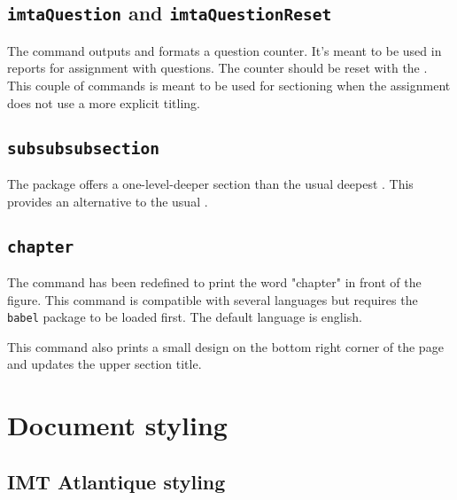 \documentclass{report}
\begin{document}
\subsection{\texttt{imtaQuestion} and \texttt{imtaQuestionReset}}
The  command outputs and formats a question counter.
It's meant to be used in reports for assignment with questions.
The counter should be reset with the .
This couple of commands is meant to be used for sectioning when the assignment does not use a more explicit titling.

\subsection{\texttt{subsubsubsection}}
The  package offers a one-level-deeper section than the usual deepest .
This provides an alternative to the usual .

\subsection{\texttt{chapter}}
The  command has been redefined to print the word "chapter" in front of the figure. This command is compatible with several languages but requires the \texttt{babel} package to be loaded first. The default language is english.

This command also prints a small design on the bottom right corner of the page and updates the upper section title.


\section{Document styling}

\subsection{IMT Atlantique styling}
\end{document}
